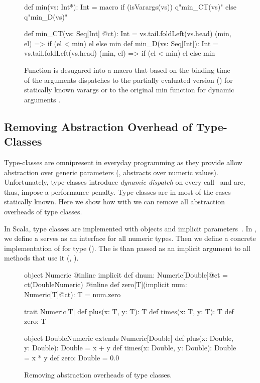 \begin{figure}
\begin{listing}
def min(vs: Int*): Int = macro
  if (isVarargs(vs)) q"min_CT(vs)"
  else q"min_D(vs)"

def min_CT(vs: Seq[Int] @ct): Int =
  vs.tail.foldLeft(vs.head) { (min, el) =>
  if (el < min) el else min
}
def min_D(vs: Seq[Int]): Int =
  vs.tail.foldLeft(vs.head) {
    (min, el) => if (el < min) el else min
  }
\end{listing}
\caption{Function  is desugared into a  macro that based on the
binding time of the arguments dispatches to the partially evaluated version ()
for statically known varargs or to the original min function for dynamic arguments .}
\label{fig:min}
\end{figure}

\subsection{Removing Abstraction Overhead of Type-Classes}
\label{sct:type-classes-removal}

Type-classes are omnipresent in everyday programming as they provide allow abstraction over
 generic parameters (\eg,  abstracts over numeric values). Unfortunately,
 type-classes introduce \emph{dynamic dispatch} on every call~\cite{rompf_optimizing_2013} and are,
 thus, impose a performance penalty. Type-classes are in most of the cases statically known. Here
 we show how with \tool we can remove all abstraction overheads of type classes.

In Scala, type classes are implemented with objects and implicit parameters~\cite{oliveira_type_2010}.
In , we define a  serves as an interface for
all numeric types. Then we define a concrete implementation of  for
type  (). The  is than passed
as an implicit argument  to all methods that use it (\eg, ).

\begin{figure}
\begin{listing}
object Numeric {
  @inline implicit def dnum: Numeric[Double]@ct =
    ct(DoubleNumeric)
  @inline def zero[T](implicit num: Numeric[T]@ct): T =
    num.zero
}

trait Numeric[T] {
  def plus(x: T, y: T): T
  def times(x: T, y: T): T
  def zero: T
}

object DoubleNumeric extends Numeric[Double] {
  def plus(x: Double, y: Double): Double = x + y
  def times(x: Double, y: Double): Double = x * y
  def zero: Double = 0.0
}
\end{listing}
\caption{\label{fig:numeric} Removing abstraction overheads of type classes.}
\end{figure}

